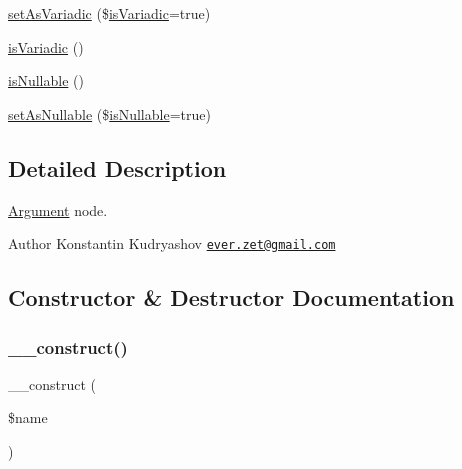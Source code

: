 \begin{DoxyCompactItemize}
\item 
\mbox{\hyperlink{class_prophecy_1_1_doubler_1_1_generator_1_1_node_1_1_argument_node_a6acbbec885ca253f802429f7b6a96bf6}{set\+As\+Variadic}} (\$\mbox{\hyperlink{class_prophecy_1_1_doubler_1_1_generator_1_1_node_1_1_argument_node_ab2aa651fb210b4868f4c2a846ab40ebb}{is\+Variadic}}=true)
\item 
\mbox{\hyperlink{class_prophecy_1_1_doubler_1_1_generator_1_1_node_1_1_argument_node_ab2aa651fb210b4868f4c2a846ab40ebb}{is\+Variadic}} ()
\item 
\mbox{\hyperlink{class_prophecy_1_1_doubler_1_1_generator_1_1_node_1_1_argument_node_ae8fae740d59f7524f81c796142d3a846}{is\+Nullable}} ()
\item 
\mbox{\hyperlink{class_prophecy_1_1_doubler_1_1_generator_1_1_node_1_1_argument_node_a2047139f8e03ab60402832d508ec0169}{set\+As\+Nullable}} (\$\mbox{\hyperlink{class_prophecy_1_1_doubler_1_1_generator_1_1_node_1_1_argument_node_ae8fae740d59f7524f81c796142d3a846}{is\+Nullable}}=true)
\end{DoxyCompactItemize}


\subsection{Detailed Description}
\mbox{\hyperlink{class_prophecy_1_1_argument}{Argument}} node.

\begin{DoxyAuthor}{Author}
Konstantin Kudryashov \href{mailto:ever.zet@gmail.com}{\tt ever.\+zet@gmail.\+com} 
\end{DoxyAuthor}


\subsection{Constructor \& Destructor Documentation}
\mbox{\label{class_prophecy_1_1_doubler_1_1_generator_1_1_node_1_1_argument_node_a4717bbfc70a40a57ee741ed70766c309}} 
\subsubsection{\texorpdfstring{\+\_\+\+\_\+construct()}{\_\_construct()}}
{\footnotesize\ttfamily \+\_\+\+\_\+construct (\begin{DoxyParamCaption}\item[{}]{\$name }\end{DoxyParamCaption})}


